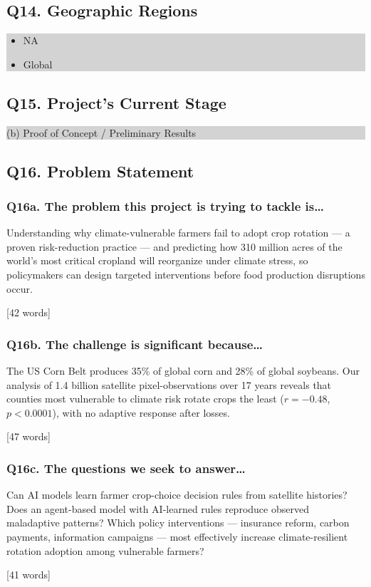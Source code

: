 \documentclass[11pt,letterpaper]{article}
\newcommand{\answer}[1]{%
    \vspace{0.2em}%
    \noindent\colorbox{answerbox}{\parbox{\dimexpr\textwidth-2\fboxsep}{%
        \vspace{0.4em}#1\vspace{0.4em}%
    }}%
    \vspace{0.5em}%
}
\newcommand{\selection}[1]{%
    \vspace{0.2em}%
    \noindent\colorbox{lightgray}{\parbox{\dimexpr\textwidth-2\fboxsep}{%
        \vspace{0.3em}#1\vspace{0.3em}%
    }}%
    \vspace{0.5em}%
}
\newcommand{\wordcount}[1]{%
    \hfill{\scriptsize\textcolor{notegray}{[#1 words]}}%
}
\begin{document}
\subsection{Q14. Geographic Regions}
\selection{
\begin{itemize}[nosep,leftmargin=1.5em]
    \item[$\boxtimes$] NA
    \item[$\boxtimes$] Global
\end{itemize}
}

\subsection{Q15. Project's Current Stage}
\selection{(b) Proof of Concept / Preliminary Results}

\subsection{Q16. Problem Statement}

\subsubsection{Q16a. The problem this project is trying to tackle is\ldots}
\answer{Understanding why climate-vulnerable farmers fail to adopt crop rotation --- a proven risk-reduction practice --- and predicting how 310 million acres of the world's most critical cropland will reorganize under climate stress, so policymakers can design targeted interventions before food production disruptions occur.}
\wordcount{42}

\subsubsection{Q16b. The challenge is significant because\ldots}
\answer{The US Corn Belt produces 35\% of global corn and 28\% of global soybeans. Our analysis of 1.4 billion satellite pixel-observations over 17 years reveals that counties most vulnerable to climate risk rotate crops the least ($r = -0.48$, $p < 0.0001$), with no adaptive response after losses.}
\wordcount{47}

\subsubsection{Q16c. The questions we seek to answer\ldots}
\answer{Can AI models learn farmer crop-choice decision rules from satellite histories? Does an agent-based model with AI-learned rules reproduce observed maladaptive patterns? Which policy interventions --- insurance reform, carbon payments, information campaigns --- most effectively increase climate-resilient rotation adoption among vulnerable farmers?}
\wordcount{41}
\end{document}
